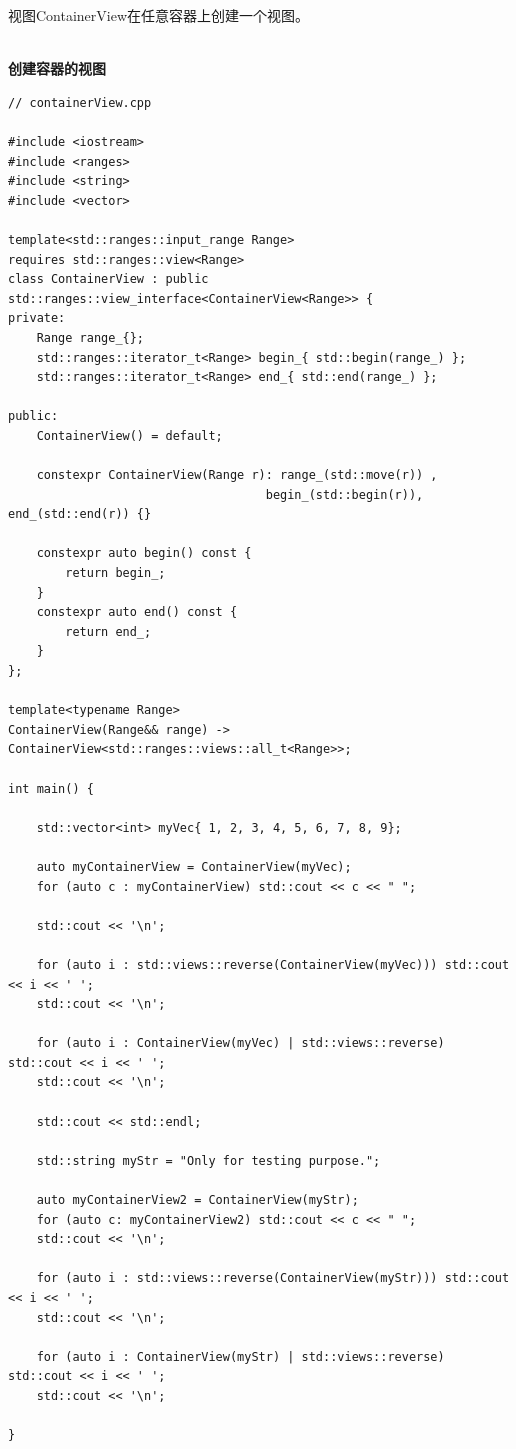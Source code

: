 视图ContainerView在任意容器上创建一个视图。

\hspace*{\fill} \\ %
\noindent
\textbf{创建容器的视图}
\begin{lstlisting}[style=styleCXX]
// containerView.cpp

#include <iostream>
#include <ranges>
#include <string>
#include <vector>

template<std::ranges::input_range Range>
requires std::ranges::view<Range>
class ContainerView : public std::ranges::view_interface<ContainerView<Range>> {
private:
	Range range_{};
	std::ranges::iterator_t<Range> begin_{ std::begin(range_) };
	std::ranges::iterator_t<Range> end_{ std::end(range_) };

public:
	ContainerView() = default;
	
	constexpr ContainerView(Range r): range_(std::move(r)) ,
									begin_(std::begin(r)), end_(std::end(r)) {}
	
	constexpr auto begin() const {
		return begin_;
	}
	constexpr auto end() const {
		return end_;
	}
};

template<typename Range>
ContainerView(Range&& range) -> ContainerView<std::ranges::views::all_t<Range>>;

int main() {

	std::vector<int> myVec{ 1, 2, 3, 4, 5, 6, 7, 8, 9};
	
	auto myContainerView = ContainerView(myVec);
	for (auto c : myContainerView) std::cout << c << " ";
	
	std::cout << '\n';
	
	for (auto i : std::views::reverse(ContainerView(myVec))) std::cout << i << ' ';
	std::cout << '\n';
	
	for (auto i : ContainerView(myVec) | std::views::reverse) std::cout << i << ' ';
	std::cout << '\n';
	
	std::cout << std::endl;
	
	std::string myStr = "Only for testing purpose.";
	
	auto myContainerView2 = ContainerView(myStr);
	for (auto c: myContainerView2) std::cout << c << " ";
	std::cout << '\n';
	
	for (auto i : std::views::reverse(ContainerView(myStr))) std::cout << i << ' ';
	std::cout << '\n';
	
	for (auto i : ContainerView(myStr) | std::views::reverse) std::cout << i << ' ';
	std::cout << '\n';

}
\end{lstlisting}

